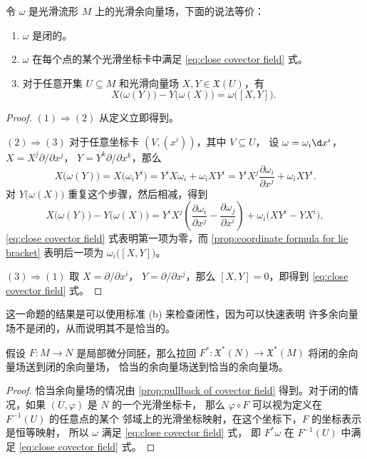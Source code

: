 \begin{proposition}
  令 $\omega$ 是光滑流形 $M$ 上的光滑余向量场，下面的说法等价：
  \begin{enumerate}
    \item $\omega$ 是闭的。
    \item $\omega$ 在每个点的某个光滑坐标卡中满足 \eqref{eq:close covector field} 式。
    \item 对于任意开集 $U\subseteq M$ 和光滑向量场 $X,Y\in \mathfrak{X}(U)$，有
    \begin{equation}\label{eq:close covector field without coordinate}
      X\bigl(\omega(Y)\bigr)-Y\bigl(\omega(X)\bigr)=\omega\bigl([X,Y]\bigr).
    \end{equation}
  \end{enumerate}
\end{proposition}
\begin{proof}
  $(1)\Rightarrow (2)$ 从定义立即得到。

  $(2)\Rightarrow(3)$ 对于任意坐标卡 $(V,(x^i))$，其中 $V\subseteq U$，
  设 $\omega=\omega_i\d x^i$，$X=X^j\partial/\partial x^j$，
  $Y=Y^k\partial/\partial x^k$，那么
  \[
    X\bigl(\omega(Y)\bigr)=X\bigl(\omega_iY^i\bigr)
    = Y^i X\omega_i+\omega_iXY^i=
    Y^iX^j\frac{\partial \omega_i}{\partial x^j}
    +\omega_iXY^i.
  \]
  对 $Y\bigl(\omega(X)\bigr)$ 重复这个步骤，然后相减，得到
  \[
    X\bigl(\omega(Y)\bigr)-Y\bigl(\omega(X)\bigr)=
    Y^iX^j\left(\frac{\partial \omega_i}{\partial x^j}-
    \frac{\partial \omega_j}{\partial x^i}\right)
    +\omega_i\bigl(XY^i-YX^i\bigr),
  \]
  \eqref{eq:close covector field} 式表明第一项为零，而 
  \autoref{prop:coordinate formula for lie bracket} 表明后一项为
  $\omega_i\bigl([X,Y]\bigr)$。

  $(3)\Rightarrow (1)$ 取 $X=\partial/\partial x^i$，
  $Y=\partial/\partial x^j$，那么 $[X,Y]=0$，即得到
  \eqref{eq:close covector field} 式。
\end{proof}

这一命题的结果是可以使用标准 (b) 来检查闭性，因为可以快速表明
许多余向量场不是闭的，从而说明其不是恰当的。

\begin{corollary}
  假设 $F:M\to N$ 是局部微分同胚，那么拉回 $F^*:\mathfrak{X}^*(N)
  \to \mathfrak{X}^*(M)$ 将闭的余向量场送到闭的余向量场，
  恰当的余向量场送到恰当的余向量场。
\end{corollary}
\begin{proof}
  恰当余向量场的情况由 \autoref{prop:pullback of covector field}
  得到。对于闭的情况，如果 $(U,\varphi)$ 是 $N$ 的一个光滑坐标卡，
  那么 $\varphi\circ F$ 可以视为定义在 $F^{-1}(U)$ 的任意点的某个
  邻域上的光滑坐标映射，在这个坐标下，$F$ 的坐标表示是恒等映射，
  所以 $\omega$ 满足 \eqref{eq:close covector field} 式，
  即 $F^*\omega$ 在 $F^{-1}(U)$ 中满足 \eqref{eq:close covector field} 式。
\end{proof}

